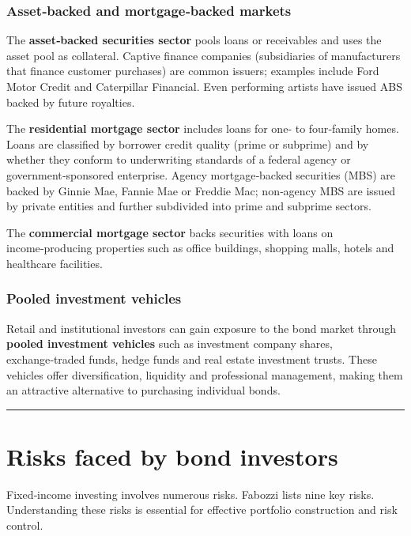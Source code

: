 \documentclass[
  letterpaper,
  DIV=11,
  numbers=noendperiod]{scrartcl}
\begin{document}
\subsubsection{Asset‑backed and mortgage‑backed
markets}\label{assetbacked-and-mortgagebacked-markets}

The \textbf{asset‑backed securities sector} pools loans or receivables
and uses the asset pool as collateral. Captive finance companies
(subsidiaries of manufacturers that finance customer purchases) are
common issuers; examples include Ford Motor Credit and Caterpillar
Financial. Even performing artists have issued ABS backed by future
royalties.

The \textbf{residential mortgage sector} includes loans for one‑ to
four‑family homes. Loans are classified by borrower credit quality
(prime or subprime) and by whether they conform to underwriting
standards of a federal agency or government‑sponsored enterprise. Agency
mortgage‑backed securities (MBS) are backed by Ginnie Mae, Fannie Mae or
Freddie Mac; non‑agency MBS are issued by private entities and further
subdivided into prime and subprime sectors.

The \textbf{commercial mortgage sector} backs securities with loans on
income‑producing properties such as office buildings, shopping malls,
hotels and healthcare facilities.

\subsubsection{Pooled investment
vehicles}\label{pooled-investment-vehicles}

Retail and institutional investors can gain exposure to the bond market
through \textbf{pooled investment vehicles} such as investment company
shares, exchange‑traded funds, hedge funds and real estate investment
trusts. These vehicles offer diversification, liquidity and professional
management, making them an attractive alternative to purchasing
individual bonds.

\begin{center}\rule{0.5\linewidth}{0.5pt}\end{center}

\section{Risks faced by bond
investors}\label{risks-faced-by-bond-investors}

Fixed‑income investing involves numerous risks. Fabozzi lists nine key
risks. Understanding these risks is essential for effective portfolio
construction and risk control.
\end{document}
